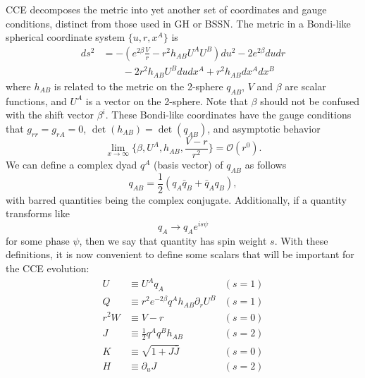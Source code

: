 \begin{bibunit}[unsrtnat]
CCE decomposes the metric into yet another set of coordinates and gauge
conditions, distinct from those used in GH or BSSN. The metric in a Bondi-like
spherical coordinate system $\{u,r,x^A\}$ is
\begin{align}
  ds^2 &= -\left(e^{2\beta}\frac{V}{r} - r^2h_{AB}U^AU^B\right)du^2 - 2e^{2\beta}dudr \nonumber\\
    &\quad\quad -2r^2h_{AB}U^Bdudx^A + r^2h_{AB}dx^Adx^B
\end{align}
where $h_{AB}$ is related to the metric on the 2-sphere $q_{AB}$, $V$ and
$\beta$ are scalar functions, and $U^A$ is a vector on the 2-sphere. Note that
$\beta$ should not be confused with the shift vector $\beta^i$. These Bondi-like
coordinates have the gauge conditions that $g_{rr} = g_{rA} = 0$,
$\det{(h_{AB})} = \det{(q_{AB})}$, and asymptotic behavior
\begin{equation}
  \lim_{x\rightarrow\infty} \{\beta, U^A, h_{AB}, \frac{V-r}{r^2} \} = \mathcal{O}(r^0) .
\end{equation}
We can define a complex dyad $q^A$ (basis vector) of $q_{AB}$ as follows
\begin{equation}
  q_{AB} = \frac{1}{2}\left(q_A\bar{q}_B + \bar{q}_Aq_B\right),
\end{equation}
with barred quantities being the complex conjugate. Additionally, if a quantity
transforms like
\begin{equation}
  q_A \rightarrow q_A e^{is\psi}
\end{equation}
for some phase $\psi$, then we say that quantity has spin weight $s$. With these
definitions, it is now convenient to define some scalars that will be important
for the CCE evolution:
\begin{align}
  \label{eq:bondi_u}
  U &\equiv U^Aq_A & (s=1) \\
  Q &\equiv r^2e^{-2\beta}q^Ah_{AB}\partial_r U^B & (s=1) \\
  r^2W &\equiv V-r & (s=0) \\
  J &\equiv \frac{1}{2}q^Aq^Bh_{AB} & (s=2) \\
  K &\equiv \sqrt{1+J\bar{J}} & (s=0) \\
  \label{eq:bondi_h}
  H &\equiv \partial_u J & (s=2)
\end{align}


\end{bibunit}
